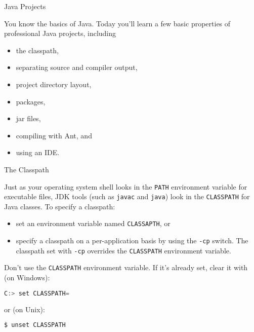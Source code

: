 \documentclass{beamer}
\author[Chris Simpkins]
{Christopher Simpkins \\\texttt{chris.simpkins@gatech.edu}}
\institute[Georgia Tech] %
\date[CS 1331]{}
\begin{document}
\begin{frame}
  \titlepage
\end{frame}

\begin{frame}[fragile]{Java Projects}


You know the basics of Java.  Today you'll learn a few basic properties of professional Java projects, including
\begin{itemize}
\item the classpath,
\item separating source and compiler output,
\item project directory layout,
\item packages,
\item jar files,
\item compiling with Ant, and
\item using an IDE.
\end{itemize}

\end{frame}

\begin{frame}[fragile]{The Classpath}


Just as your operating system shell looks in the {\tt PATH} environment variable for executable files, JDK tools (such as {\tt javac} and {\tt java}) look in the {\tt CLASSPATH} for Java classes. To specify a classpath:

\begin{itemize}
\item set an environment variable named {\tt CLASSAPTH}, or
\item specify a classpath on a per-application basis by using the {\tt -cp} switch.  The classpath set with {\tt -cp} overrides the {\tt CLASSPATH} environment variable.
\end{itemize}
Don't use the {\tt CLASSPATH} environment variable.  If it's already set, clear it with (on Windows):
\begin{lstlisting}[language=Java]
C:> set CLASSPATH=
\end{lstlisting}
or (on Unix):
\begin{lstlisting}[language=Java]
$ unset CLASSPATH
\end{lstlisting}

\end{frame}
\end{document}

